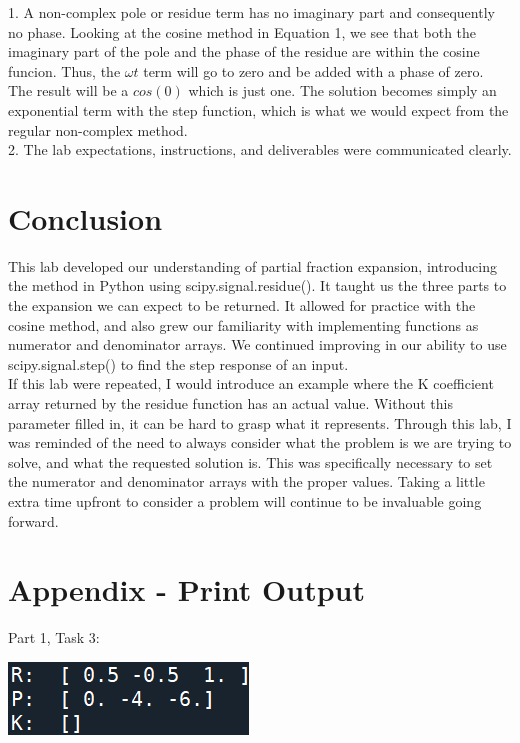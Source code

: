 \documentclass[12pt]{report}
\begin{document}
1. A non-complex pole or residue term has no imaginary part and consequently no phase. Looking at the cosine method in Equation 1, we see that both the imaginary part of the pole and the phase of the residue are within the cosine funcion. Thus, the $ \omega t $ term will go to zero and be added with a phase of zero. The result will be a $ cos(0) $ which is just one. The solution becomes simply an exponential term with the step function, which is what we would expect from the regular non-complex method. \\

2. The lab expectations, instructions, and deliverables were communicated clearly. \\
	
\section{Conclusion}

This lab developed our understanding of partial fraction expansion, introducing the method in Python using scipy.signal.residue(). It taught us the three parts to the expansion we can expect to be returned. It allowed for practice with the cosine method, and also grew our familiarity with implementing functions as numerator and denominator arrays. We continued improving in our ability to use scipy.signal.step() to find the step response of an input. \\

If this lab were repeated, I would introduce an example where the K coefficient array returned by the residue function has an actual value. Without this parameter filled in, it can be hard to grasp what it represents. Through this lab, I was reminded of the need to always consider what the problem is we are trying to solve, and what the requested solution is. This was specifically necessary to set the numerator and denominator arrays with the proper values. Taking a little extra time upfront to consider a problem will continue to be invaluable going forward. \\
	
\newpage
\appendix
\section*{Appendix - Print Output}

Part 1, Task 3:
\begin{center}
	\includegraphics[scale = 1.25]{Lab 6 - Print Outputs/Part1-Task3.png}\\[1.0 cm]
\end{center}
\end{document}
